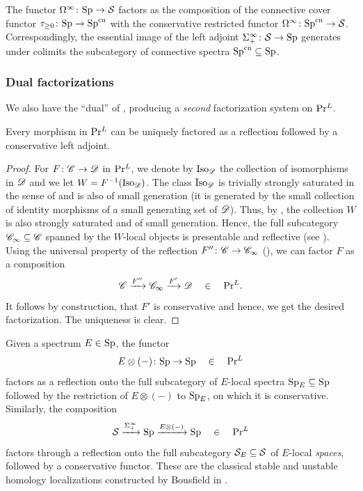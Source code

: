 \documentclass[12pt]{article}
\begin{document}
\begin{example}
     The functor $\Omega^\infty\colon \mathrm{Sp} \to \mathcal{S}$ factors as the composition of the connective cover functor $\tau_{\ge0}\colon \mathrm{Sp} \to \mathrm{Sp}^{\mathrm{cn}}$ with the conservative restricted functor $\Omega^\infty\colon\mathrm{Sp}^{\mathrm{cn}} \to \mathcal{S}$. Correspondingly, the essential image of the left adjoint $\Sigma_+^\infty \colon \mathcal{S} \to \mathrm{Sp}$ generates under colimits the subcategory of connective spectra $\mathrm{Sp}^{\mathrm{cn}} \subseteq \mathrm{Sp}$. 
\end{example}

\subsubsection{Dual factorizations}

We also have the ``dual'' of , producing a \textit{second} factorization system on $\mathrm{Pr}{}^L$.
\begin{prop}\label{PrL_Factor_Sys}
    Every morphism in $\mathrm{Pr}{}^L$ can be uniquely factored as a reflection followed by a conservative left adjoint.
\end{prop}
\begin{proof}
    For $F\colon \mathscr{C} \to \mathscr{D}$ in $\mathrm{Pr}{}^L$, we denote by $\mathrm{Iso}_{\mathscr{D}}$ the collection of isomorphisms in $\mathscr{D}$ and we let $W=F^{-1}(\mathrm{Iso}_{\mathscr{D}})$. The class $\mathrm{Iso}_{\mathscr{D}}$ is trivially strongly saturated in the sense of \cite[Definition 5.5.4.5]{htt} and is also of small generation (it is generated by the small collection of identity morphisms of a small generating set of $\mathscr{D}$). Thus, by \cite[Proposition 5.5.4.16]{htt}, the collection $W$ is also strongly saturated and of small generation. Hence, the full subcategory $\mathscr{C}_\infty \subseteq \mathscr{C}$ spanned by the $W$-local objects is presentable and reflective (see \cite[Proposition 5.5.4.15]{htt}). Using the universal property of the reflection $F''\colon \mathscr{C} \to \mathscr{C}_\infty$ (\cite[Proposition 5.5.4.20]{htt}), we can factor $F$ as a composition
    \[
        \mathscr{C} \xrightarrow{F''} \mathscr{C}_\infty \xrightarrow{F'} \mathscr{D}
        \quad\in\quad \mathrm{Pr}{}^L.
    \]
    It follows by construction, that $F'$ is conservative and hence, we get the desired factorization. The uniqueness is clear. 
\end{proof}

\begin{example}\label{Ex_Homology_Loc}
    Given a spectrum $E\in \mathrm{Sp}$, the functor 
    \[
        E\otimes(-)\colon \mathrm{Sp} \to \mathrm{Sp} \quad\in\quad \mathrm{Pr}{}^L
    \]
    factors as a reflection onto the full subcategory of $E$-local spectra $\mathrm{Sp}_E\subseteq \mathrm{Sp}$ followed by the restriction of $E\otimes(-)$ to $\mathrm{Sp}_E$, on which it is conservative. Similarly, the composition
    \[
        \mathcal{S} \xrightarrow{\Sigma_+^\infty} 
        \mathrm{Sp} \xrightarrow{E\otimes(-)} 
        \mathrm{Sp}
        \quad\in\quad \mathrm{Pr}{}^L
    \]
    factors through a reflection onto the full subcategory $\mathcal{S}_E \subseteq \mathcal{S}$ of $E$-local \textit{spaces}, followed by a conservative functor. These are the classical stable and unstable homology localizations constructed by Bousfield in
    \cite{bousfield1979localization,bousfield1975localization}.
\end{example}
\end{document}
